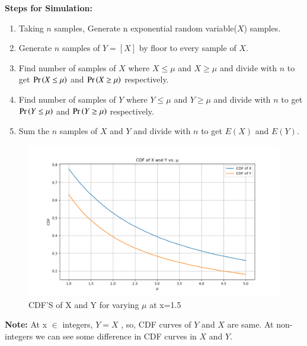 \documentclass[journal,12pt,twocolumn]{IEEEtran}
\theoremstyle{remark}
\begin{document}
\textbf{Steps for Simulation:}
\begin{enumerate}
\item Taking $n$ samples, Generate n exponential random variable($X$) samples.
\item Generate $n$ samples of $Y=[X]$ by floor to every sample of $X$.
\item Find number of samples of $X$ where $X \leq \mu$ and $X \geq \mu$ and divide with $n$ to get $\Pr\left(X \leq \mu\right)$ and $\Pr\left(X \geq \mu\right)$ respectively.
\item Find number of samples of $Y$ where $Y \leq \mu$ and $Y \geq \mu$ and divide with $n$ to get $\Pr\left(Y \leq \mu\right)$ and $\Pr\left(Y \geq \mu\right)$ respectively.
\item Sum the $n$ samples of $X$ and $Y$ and divide with $n$ to get $E(X)$ and $E(Y)$.
\end{enumerate}
\begin{figure}[!ht]
\centering
\includegraphics[width=\columnwidth]{2023/ST/52/figs/figure.png}
\caption{CDF'S of X and Y for varying $\mu$ at x=1.5}
\end{figure}
\textbf{Note:}
At x $\in$ integers, $Y=X$ , so, CDF curves of $Y$ and $X$ are same. At non-integers we can see some difference in CDF curves in $X$ and $Y$.
\end{document}

